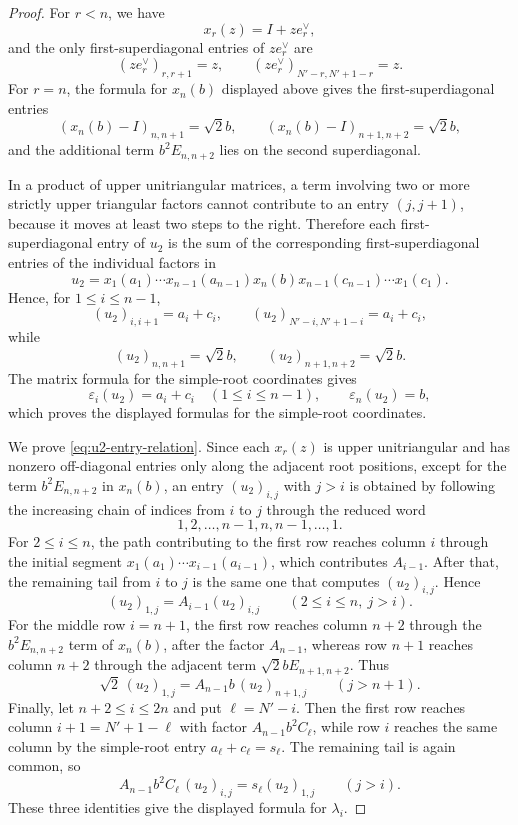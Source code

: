 \documentclass{article}
\begin{document}
\begin{proof}
For \(r<n\), we have
\[
x_r(z)=I+ze_r^\vee,
\]
and the only first-superdiagonal entries of \(ze_r^\vee\) are
\[
(ze_r^\vee)_{r,r+1}=z,
\qquad
(ze_r^\vee)_{N'-r,N'+1-r}=z.
\]
For \(r=n\), the formula for \(x_n(b)\) displayed above gives the first-superdiagonal entries
\[
(x_n(b)-I)_{n,n+1}=\sqrt2 b,
\qquad
(x_n(b)-I)_{n+1,n+2}=\sqrt2 b,
\]
and the additional term \(b^2E_{n,n+2}\) lies on the second superdiagonal.

In a product of upper unitriangular matrices, a term involving two or more strictly upper triangular factors cannot contribute to an entry \((j,j+1)\), because it moves at least two steps to the right. Therefore each first-superdiagonal entry of \(u_2\) is the sum of the corresponding first-superdiagonal entries of the individual factors in
\[
u_2=
 x_1(a_1)\cdots x_{n-1}(a_{n-1})x_n(b)
 x_{n-1}(c_{n-1})\cdots x_1(c_1).
\]
Hence, for \(1\le i\le n-1\),
\[
(u_2)_{i,i+1}=a_i+c_i,
\qquad
(u_2)_{N'-i,N'+1-i}=a_i+c_i,
\]
while
\[
(u_2)_{n,n+1}=\sqrt2 b,
\qquad
(u_2)_{n+1,n+2}=\sqrt2 b.
\]
The matrix formula for the simple-root coordinates gives
\[
\varepsilon_i(u_2)=a_i+c_i\quad(1\le i\le n-1),
\qquad
\varepsilon_n(u_2)=b,
\]
which proves the displayed formulas for the simple-root coordinates.

We prove \eqref{eq:u2-entry-relation}. Since each \(x_r(z)\) is upper unitriangular and has nonzero off-diagonal entries only along the adjacent root positions, except for the term \(b^2E_{n,n+2}\) in \(x_n(b)\), an entry \((u_2)_{i,j}\) with \(j>i\) is obtained by following the increasing chain of indices from \(i\) to \(j\) through the reduced word
\[
1,2,\ldots,n-1,n,n-1,\ldots,1.
\]
For \(2\le i\le n\), the path contributing to the first row reaches column \(i\) through the initial segment \(x_1(a_1)\cdots x_{i-1}(a_{i-1})\), which contributes \(A_{i-1}\). After that, the remaining tail from \(i\) to \(j\) is the same one that computes \((u_2)_{i,j}\). Hence
\[
(u_2)_{1,j}=A_{i-1}(u_2)_{i,j}
\qquad(2\le i\le n,\ j>i).
\]
For the middle row \(i=n+1\), the first row reaches column \(n+2\) through the \(b^2E_{n,n+2}\) term of \(x_n(b)\), after the factor \(A_{n-1}\), whereas row \(n+1\) reaches column \(n+2\) through the adjacent term \(\sqrt2 bE_{n+1,n+2}\). Thus
\[
\sqrt2\,(u_2)_{1,j}
=
A_{n-1}b\,(u_2)_{n+1,j}
\qquad(j>n+1).
\]
Finally, let \(n+2\le i\le 2n\) and put \(\ell=N'-i\). Then the first row reaches column \(i+1=N'+1-\ell\) with factor \(A_{n-1}b^2C_\ell\), while row \(i\) reaches the same column by the simple-root entry \(a_\ell+c_\ell=s_\ell\). The remaining tail is again common, so
\[
A_{n-1}b^2C_\ell\,(u_2)_{i,j}
=
s_\ell (u_2)_{1,j}
\qquad(j>i).
\]
These three identities give the displayed formula for \(\lambda_i\).
\end{proof}
\end{document}
